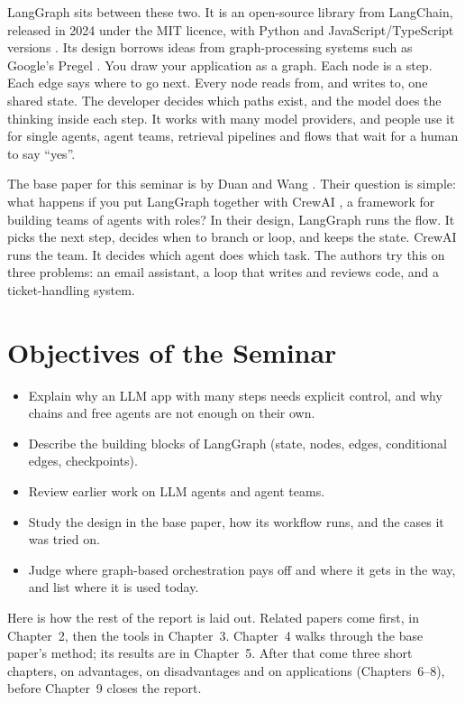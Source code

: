 \documentclass[12pt,a4paper]{report}
\begin{document}
LangGraph sits between these two. It is an open-source library from LangChain, released in 2024 under the MIT licence, with Python and JavaScript/TypeScript versions \cite{langgraphdocs}. Its design borrows ideas from graph-processing systems such as Google's Pregel \cite{malewicz2010pregel}. You draw your application as a graph. Each node is a step. Each edge says where to go next. Every node reads from, and writes to, one shared state. The developer decides which paths exist, and the model does the thinking inside each step. It works with many model providers, and people use it for single agents, agent teams, retrieval pipelines and flows that wait for a human to say ``yes''.

The base paper for this seminar is by Duan and Wang \cite{duan2024langgraphcrewai}. Their question is simple: what happens if you put LangGraph together with CrewAI \cite{crewaidocs}, a framework for building teams of agents with roles? In their design, LangGraph runs the flow. It picks the next step, decides when to branch or loop, and keeps the state. CrewAI runs the team. It decides which agent does which task. The authors try this on three problems: an email assistant, a loop that writes and reviews code, and a ticket-handling system.

\section*{Objectives of the Seminar}
\begin{itemize}
    \item Explain why an LLM app with many steps needs explicit control, and why chains and free agents are not enough on their own.
    \item Describe the building blocks of LangGraph (state, nodes, edges, conditional edges, checkpoints).
    \item Review earlier work on LLM agents and agent teams.
    \item Study the design in the base paper, how its workflow runs, and the cases it was tried on.
    \item Judge where graph-based orchestration pays off and where it gets in the way, and list where it is used today.
\end{itemize}

Here is how the rest of the report is laid out. Related papers come first, in Chapter~2, then the tools in Chapter~3. Chapter~4 walks through the base paper's method; its results are in Chapter~5. After that come three short chapters, on advantages, on disadvantages and on applications (Chapters~6--8), before Chapter~9 closes the report.
\end{document}
